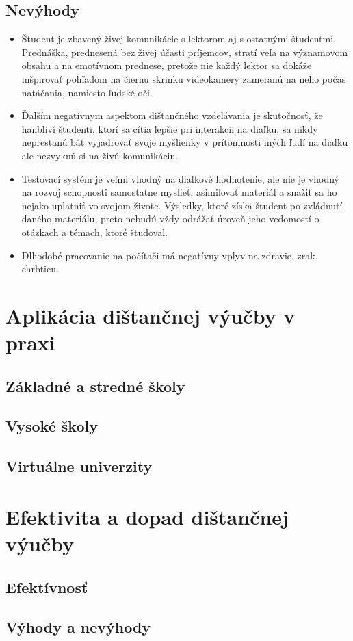\documentclass[10pt,oneside,slovak,a4paper]{article}
\begin{document}
\subsection{Nevýhody}
\begin{itemize}
	\item Študent je zbavený živej komunikácie s lektorom aj s ostatnými študentmi.
	Prednáška, prednesená bez živej účasti príjemcov, stratí veľa na významovom obsahu a na emotívnom prednese, pretože nie každý lektor sa dokáže inšpirovať pohľadom na čiernu skrinku videokamery zameranú na neho počas natáčania, namiesto ľudské oči.\cite{Sokolova2018}
	\item Ďalším negatívnym aspektom dištančného vzdelávania je skutočnosť, že hanbliví študenti, ktorí sa cítia lepšie pri interakcii na diaľku, sa nikdy neprestanú báť vyjadrovať svoje myšlienky v prítomnosti iných ľudí na diaľku ale nezvyknú si na živú komunikáciu.\cite{Sokolova2018}
	\item Testovací systém je veľmi vhodný na diaľkové hodnotenie, ale nie je vhodný na rozvoj schopnosti samostatne myslieť, asimilovať materiál a snažiť sa ho nejako uplatniť vo svojom živote.
	Výsledky, ktoré získa študent po zvládnutí daného materiálu, preto nebudú vždy odrážať úroveň jeho vedomostí o otázkach a témach, ktoré študoval.\cite{Sokolova2018}
	\item Dlhodobé pracovanie na počítači má negatívny vplyv na zdravie, zrak, chrbticu.\cite{Sokolova2018}
\end{itemize}



\section{Aplikácia dištančnej výučby v praxi}
\subsection{Základné a stredné školy}
\subsection{Vysoké školy}
\subsection{Virtuálne univerzity}

\section{Efektivita a dopad dištančnej výučby}
\subsection{Efektívnosť}
\subsection{Výhody a nevýhody}







\end{document}
